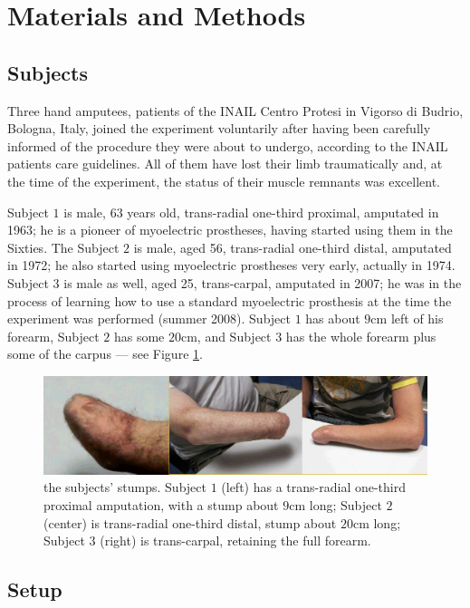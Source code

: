 \section{Materials and Methods}
\label{sec:m&ms}

\subsection{Subjects}

Three hand amputees, patients of the INAIL Centro Protesi in Vigorso
di Budrio, Bologna, Italy, joined the experiment voluntarily after
having been carefully informed of the procedure they were about to undergo,
according to the INAIL patients care guidelines. All of them have lost
their limb traumatically and, at the time of the experiment, the status of
their muscle remnants was excellent.

Subject $1$ is male, 63 years old, trans-radial
one-third proximal, amputated in 1963; he is a
pioneer of myoelectric prostheses, having started using them in the
Sixties. The Subject $2$ is male, aged 56, trans-radial one-third
distal, amputated in 1972; he also started using myoelectric prostheses
very early, actually in 1974. Subject $3$ is male as well, aged 25,
trans-carpal, amputated in 2007; he was in the process of learning how
to use a standard myoelectric prosthesis at the time the experiment was
performed (summer 2008). Subject $1$ has about $9$cm left of his
forearm, Subject $2$ has some $20$cm, and Subject $3$ has the whole forearm
plus some of the carpus --- see Figure \ref{fig:stumps}.

\begin{figure}[!ht] \centering
  \includegraphics[width=\textwidth]{figs/stumps}
  \caption{the subjects' stumps. Subject $1$ (left) has a trans-radial
    one-third proximal amputation, with a stump about $9$cm long;
    Subject $2$ (center) is trans-radial one-third distal, stump about $20$cm
    long; Subject $3$ (right) is trans-carpal, retaining the full forearm.}
  \label{fig:stumps}
\end{figure}

\subsection{Setup}


